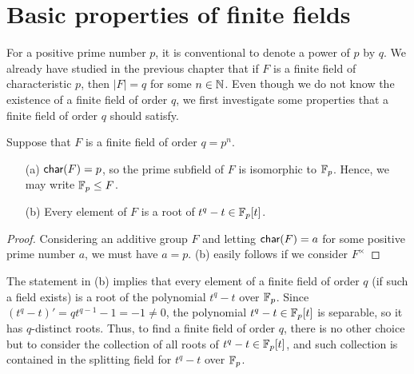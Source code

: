 \section{Basic properties of finite fields}

For a positive prime number $p$, it is conventional to denote a power of $p$ by $q$.
We already have studied in the previous chapter that if $F$ is a finite field of characteristic $p$, then $|F|=q$ for some $n\in{\mathbb{N}}$.
Even though we do not know the existence of a finite field of order $q$, we first investigate some properties that a finite field of order $q$ should satisfy.

\begin{prop}\label{properties of finite fields}
    Suppose that $F$ is a finite field of order $q=p^n$.
    \begin{enumerate}
        \item[(a)]
        {
            ${\textsf{char}({F})}=p$, so the prime subfield of $F$ is isomorphic to ${\mathbb{F}}_p$.
            Hence, we may write ${\mathbb{F}}_p\leq F$.
        }
        \item[(b)]
        {
            Every element of $F$ is a root of $t^q-t\in{\mathbb{F}}_p[t]$.
        }
    \end{enumerate}
\end{prop}
\begin{proof}
    Considering an additive group $F$ and letting ${\textsf{char}({F})}=a$ for some positive prime number $a$, we must have $a=p$.
    (b) easily follows if we consider $F^\times$
\end{proof}
\begin{obs}\label{the candidate for finite fields}
    The statement in (b) implies that every element of a finite field of order $q$ (if such a field exists) is a root of the polynomial $t^q-t$ over ${\mathbb{F}}_p$.
    Since $(t^q-t)'=qt^{q-1}-1=-1\neq 0$, the polynomial $t^q-t\in{\mathbb{F}}_p[t]$ is separable, so it has $q$-distinct roots.
    Thus, to find a finite field of order $q$, there is no other choice but to consider the collection of all roots of $t^q-t\in{\mathbb{F}}_p[t]$, and such collection is contained in the splitting field for $t^q-t$ over ${\mathbb{F}}_p$.
\end{obs}

